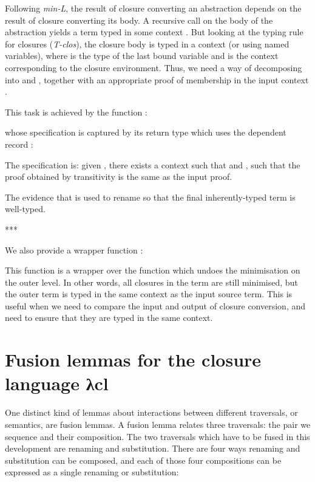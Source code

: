 \documentclass[bsc,frontabs,oneside,singlespacing,parskip,deptreport]{infthesis}
\theoremstyle{definition}
\theoremstyle{lemma}
\begin{document}

Following \textit{min-L}, the result of closure converting an
abstraction depends on the result  of closure converting its
body. A recursive call on the body of the abstraction yields a term
typed in some context . But looking at the typing rule for
closures (\textit{T-clos}), the closure body is typed in a context
 (or  using named variables), where  is
the type of the last bound variable and  is the context
corresponding to the closure environment. Thus, we need a way of
decomposing  into  and , together with an
appropriate proof of membership in the input context .

This task is achieved by the function :


whose specification is captured by its return type which uses the
dependent record :


The specification is: given , there exists a context
 such that  and , such that the
proof  obtained by transitivity is the same as the input
proof.

The evidence that  is used to rename  so that
the final inherently-typed term is well-typed.

***

We also provide a wrapper function :


This function is a wrapper over the  function which undoes
the minimisation on the outer level. In other words, all closures in
the term are still minimised, but the outer term is typed in the same
context as the input source term. This is useful when we need to
compare the input and output of closure conversion, and need to ensure
that they are typed in the same context.

\section{Fusion lemmas for the closure language λcl}

One distinct kind of lemmas about interactions between different
traversals, or semantics, are fusion lemmas.  A fusion lemma relates
three traversals: the pair we sequence and their composition. The two
traversals which have to be fused in this development are renaming and
substitution. There are four ways renaming and substitution can be
composed, and each of those four compositions can be expressed as a
single renaming or substitution:
\end{document}
